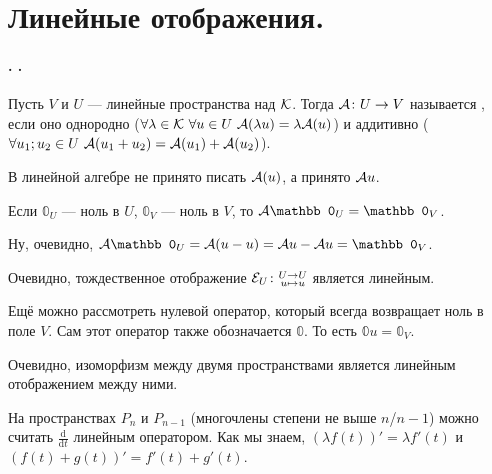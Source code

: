\documentclass{article}
\newcommand*{\id}{{\scriptE}}
\begin{document}
    \section{Линейные отображения.}
    \paragraph{. .}
    \begin{itemize}
        \dfn Пусть $V$ и $U$ --- линейные пространства над ${\mathcal{K}}$. Тогда ${\mathcal{A}}\colon U\to V$ называется , если оно однородно ($\forall\lambda\in{\mathcal{K}}~\forall u\in U~{\mathcal{A}}(\lambda u)=\lambda{\mathcal{A}}(u)$) и аддитивно ($\forall u_1;u_2\in U~{\mathcal{A}}(u_1+u_2)={\mathcal{A}}(u_1)+{\mathcal{A}}(u_2)$).
        \begin{Comment}
            В линейной алгебре не принято писать ${\mathcal{A}}(u)$, а принято ${\mathcal{A}} u$.
        \end{Comment}
        \thm Если $\mathbb0_U$ --- ноль в $U$, $\mathbb0_V$ --- ноль в $V$, то $\scriptA\mathbb0_U=\mathbb0_V$.
        \begin{Proof}
            Ну, очевидно, $\scriptA\mathbb0_U=\scriptA(u-u)=\scriptA u-\scriptA u=\mathbb0_V$.
        \end{Proof}
        \begin{Example}
            Очевидно, тождественное отображение $\id_U\colon\substack{U\to U\\u\mapsto u}$ является линейным.
        \end{Example}
        \begin{Example}
            Ещё можно рассмотреть нулевой оператор, который всегда возвращает ноль в поле $V$. Сам этот оператор также обозначается $\mathbb0$. То есть $\mathbb0u=\mathbb0_V$.
        \end{Example}
        \begin{Example}
            Очевидно, изоморфизм между двумя пространствами является линейным отображением между ними.
        \end{Example}
        \begin{Example}
            На пространствах $P_n$ и $P_{n-1}$ (многочлены степени не выше $n$/$n-1$) можно считать $\frac{\mathrm d}{\mathrm dt}$ линейным оператором. Как мы знаем, $(\lambda f(t))'=\lambda f'(t)$ и $(f(t)+g(t))'=f'(t)+g'(t)$.
        \end{Example}
        \begin{Example}

\end{Example}
\end{itemize}
\end{document}
